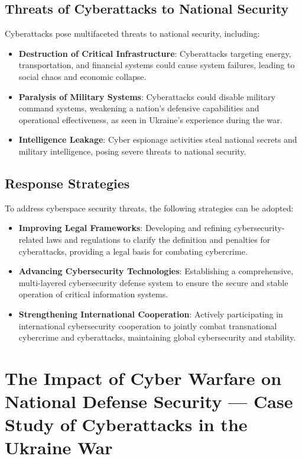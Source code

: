 \documentclass[12pt, a4paper]{article}
\begin{document}
\subsection{Threats of Cyberattacks to National Security}
Cyberattacks pose multifaceted threats to national security, including:
\begin{itemize}
    \item \textbf{Destruction of Critical Infrastructure}: Cyberattacks targeting energy, transportation, and financial systems could cause system failures, leading to social chaos and economic collapse.
    \item \textbf{Paralysis of Military Systems}: Cyberattacks could disable military command systems, weakening a nation's defensive capabilities and operational effectiveness, as seen in Ukraine's experience during the war.
    \item \textbf{Intelligence Leakage}: Cyber espionage activities steal national secrets and military intelligence, posing severe threats to national security.
\end{itemize}

\subsection{Response Strategies}
To address cyberspace security threats, the following strategies can be adopted:
\begin{itemize}
    \item \textbf{Improving Legal Frameworks}: Developing and refining cybersecurity-related laws and regulations to clarify the definition and penalties for cyberattacks, providing a legal basis for combating cybercrime.
    \item \textbf{Advancing Cybersecurity Technologies}: Establishing a comprehensive, multi-layered cybersecurity defense system to ensure the secure and stable operation of critical information systems.
    \item \textbf{Strengthening International Cooperation}: Actively participating in international cybersecurity cooperation to jointly combat transnational cybercrime and cyberattacks, maintaining global cybersecurity and stability.
\end{itemize}

\section{The Impact of Cyber Warfare on National Defense Security — Case Study of Cyberattacks in the Ukraine War}
\label{sec:cyber_warfare_impact}
\end{document}
